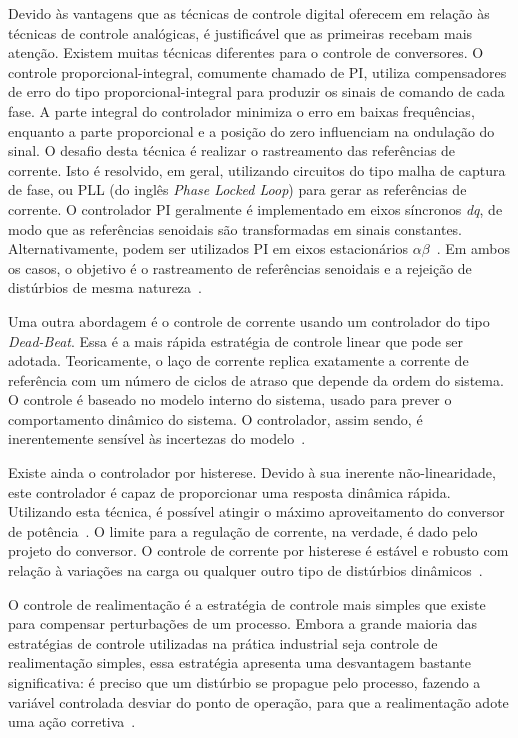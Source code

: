 	Devido às vantagens que as técnicas de controle digital oferecem em relação às técnicas de controle analógicas, é justificável que as primeiras recebam mais atenção. Existem muitas técnicas diferentes para o controle de conversores. O controle proporcional-integral, comumente chamado de PI, utiliza compensadores de erro do tipo proporcional-integral para produzir os sinais de comando de cada fase. A parte integral do controlador minimiza o erro em baixas frequências, enquanto a parte proporcional e a posição do zero influenciam na ondulação do sinal. O desafio desta técnica é realizar o rastreamento das referências de corrente. Isto é resolvido, em geral, utilizando circuitos do tipo malha de captura de fase, ou PLL (do inglês \emph{Phase Locked Loop}) para gerar as referências de corrente. O controlador PI geralmente é implementado em eixos síncronos \emph{dq}, de modo que as referências senoidais são transformadas em sinais constantes. Alternativamente, podem ser utilizados PI em eixos estacionários $\alpha \beta$~\cite{ref:KAZMIERKOWSKI}. Em ambos os casos, o objetivo é o rastreamento de referências senoidais e a rejeição de distúrbios de mesma natureza~\cite{ref:AREERAK}.

	Uma outra abordagem é o controle de corrente usando um controlador do tipo \emph{Dead-Beat}. Essa é a mais rápida estratégia de controle linear que pode ser adotada. Teoricamente, o laço de corrente replica exatamente a corrente de referência com um número de ciclos de atraso que depende da ordem do sistema. O controle é baseado no modelo interno do sistema, usado para prever o comportamento dinâmico do sistema. O controlador, assim sendo, é inerentemente sensível às incertezas do modelo~\cite{ref:MALESANI}.

	Existe ainda o controlador por histerese. Devido à sua inerente não-linearidade, este controlador é capaz de proporcionar uma resposta dinâmica rápida. Utilizando esta técnica, é possível atingir o máximo aproveitamento do conversor de potência~\cite{ref:YAO}. O limite para a regulação de corrente, na verdade, é dado pelo projeto do conversor. O controle de corrente por histerese é estável e robusto com relação à variações na carga ou qualquer outro tipo de distúrbios
	dinâmicos~\cite{ref:TENTI}.

	O controle de realimentação é a estratégia de controle mais simples que existe para compensar perturbações de um processo. Embora a grande maioria das estratégias de controle utilizadas na prática industrial seja controle de realimentação simples, essa estratégia apresenta uma desvantagem bastante significativa: é preciso que um distúrbio se propague pelo processo, fazendo a variável controlada desviar do ponto de operação, para que a realimentação adote uma ação corretiva~\cite{ref:SMITH}.

